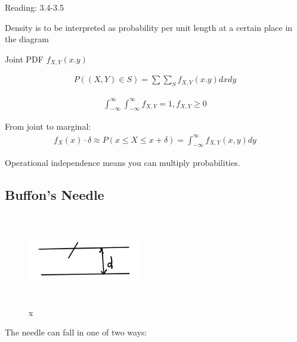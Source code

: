 
Reading: 3.4-3.5



 Density is to be interpreted as probability per unit length at a certain place in the diagram


Joint PDF $f_{X,Y}(x.y)$

\begin{align*}
P((X,Y) \in S) = \sum \sum_S f_{X,Y}(x.y)dx dy
\end{align*}

\begin{align*}
\int_{-\infty}^{\infty} \int_{-\infty}^{\infty} f_{X,Y} = 1, f_{X,Y} \ge 0
\end{align*}

From joint to marginal:
\begin{align*}
f_X(x) \cdot \delta \approx P(x \le X \le x + \delta) = \int_{-\infty}^{\infty} f_{X,Y}(x,y)dy
\end{align*}

 Operational independence means you can multiply probabilities.

\subsection{Buffon's Needle}


\begin{figure}[ht]
\centering
\includegraphics[width=5cm, height=4cm]{images/L09/buffon0.jpeg}
\caption{x}
\end{figure}

The needle can fall in one of two ways:

